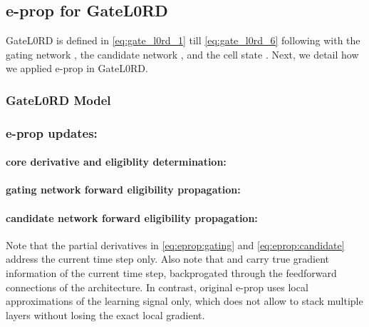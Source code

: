 \documentclass{article} \usepackage{iclr2023_conference_arxiv,times}
\begin{document}
\subsection{e-prop for GateL0RD}
 
 GateL0RD is defined in \autoref{eq:gate_l0rd_1} till \autoref{eq:gate_l0rd_6} following \citet{gumbsch2021sparsely} with the gating network , the candidate network , and the cell state .
Next, we detail how we applied e-prop in GateL0RD.

\subsubsection{GateL0RD Model}




\subsubsection{e-prop updates:}

\paragraph{core derivative and eligiblity determination:}


\paragraph{gating network forward eligibility propagation:}




\paragraph{candidate network  forward eligibility propagation:}






Note that the partial derivatives  in \autoref{eq:eprop:gating} and \autoref{eq:eprop:candidate} address the current time step  only. Also note that  and  carry true gradient information of the current time step, backprogated through the feedforward connections of the architecture. In contrast, original e-prop uses local approximations of the learning signal only, which does not allow to stack multiple layers without losing the exact local gradient. 
\end{document}
